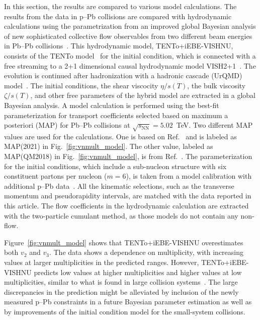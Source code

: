In this section, the results are compared to various model calculations.
The results from the data in p--Pb collisions are compared with hydrodynamic calculations using the parametrization from an improved global
Bayesian analysis of new sophisticated collective flow observables
 from two different beam energies in Pb--Pb collisions~\cite{Parkkila:2021yha}. This hydrodynamic model, {TENTo}+iEBE-VISHNU, consists of the {TENTo} model~\cite{Moreland:2014oya} for the initial condition, which is connected with a free streaming to a 2+1 dimensional causal hydrodynamic model VISH2+1~\cite{Shen:2014vra}. The evolution is continued after hadronization with a hadronic cascade (UrQMD) model~\cite{Bass:1998ca,Bleicher:1999xi}. The initial conditions, the shear viscocity $\eta/s(T)$, the bulk viscosity $\zeta/s(T)$, and other free parameters of the hybrid model are extracted in a global Bayesian analysis.
A model calculation is performed using the best-fit parameterization for transport coefficients selected based on maximum a posteriori (MAP) for Pb--Pb collisions at $\sqrt{s_{\text{NN}}}=5.02$~TeV. Two different MAP values are used for the calculations. One is based on Ref.~\cite{Parkkila:2021yha} and is labeled as MAP(2021) in Fig.~\ref{fig:vnmult_model}. The other value, labeled as MAP(QM2018) in Fig.~\ref{fig:vnmult_model}, is from Ref.~\cite{Bernhard:2016tnd}. The parameterization for the initial conditions, which include a sub-nucleon structure with six constituent partons per nucleon ($m=6$), is taken from a model calibration with additional p--Pb data~\cite{Moreland:2018gsh}. All the kinematic selections, such as the transverse momentum and pseudorapidity intervals, are matched with the data reported in this article. The flow coefficients in the hydrodynamic calculation are extracted with the two-particle cumulant method, as those models do not contain any non-flow. %

Figure~\ref{fig:vnmult_model} shows that {TENTo}+iEBE-VISHNU overestimates both $v_2$ and $v_3$. The data shows a dependence on multiplicity, with increasing values at larger multiplicities in the predicted ranges. However, {TENTo}+iEBE-VISHNU predicts low values at higher multiplicities and higher values at low multiplicities, similar to what is found in large collision systems~\cite{Acharya:2020taj}. The large discrepancies in the prediction might be alleviated by inclusion of the newly measured p--Pb constraints in a future Bayesian parameter estimation as well as by improvements of the initial condition model for the small-system collisions.

